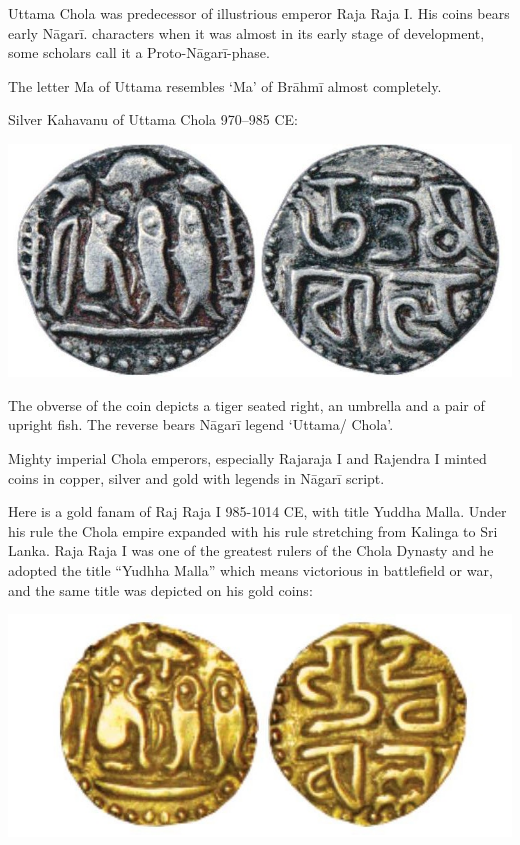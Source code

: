 Uttama Chola was predecessor of illustrious emperor Raja Raja I. His coins bears early Nāgarī. characters when it was almost in its early stage of development, some scholars call it a Proto-Nāgarī-phase.

The letter Ma of Uttama resembles ‘Ma’ of Brāhmī almost completely.

Silver Kahavanu of Uttama Chola 970–985 CE:

\vskip 5pt

\centerline{\includegraphics[scale=1.1]{"images/article-06/art06-fig08.jpg"}}

The obverse of the coin depicts a tiger seated right, an umbrella and a pair of upright fish. The reverse bears Nāgarī legend ‘Uttama/ Chola’.

Mighty imperial Chola emperors, especially Rajaraja I and Rajendra I minted coins in copper, silver and gold with legends in Nāgarī script.

Here is a gold fanam of Raj Raja I 985-1014 CE, with title Yuddha Malla. Under his rule the Chola empire expanded with his rule stretching from Kalinga to Sri Lanka. Raja Raja I was one of the greatest rulers of the Chola Dynasty and he adopted the title “Yudhha Malla” which means victorious in battlefield or war, and the same title was depicted on his gold coins:

\vskip 4pt

\centerline{\includegraphics[scale=0.95]{"images/article-06/art06-fig09.jpg"}}

